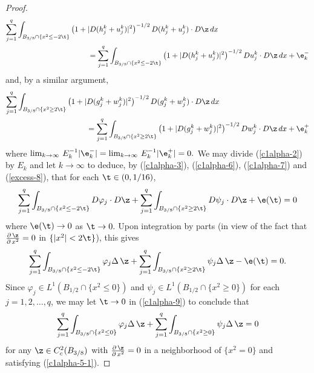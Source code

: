 \documentclass[a4paper,11pt]{amsart}
\begin{document}
\begin{proof}
\begin{eqnarray}\label{c1alpha-6}
\sum_{j=1}^{q}\int_{B_{3/8} \cap \{x^{2} \leq -2\t\}}\left(1 + |D(h_{j}^{k} + u_{j}^{k})|^{2}\right)^{-1/2} D(h_{j}^{k} + u_{j}^{k}) \cdot D\z \,dx &&\nonumber\\
&&\hspace{-2.5in}=\sum_{j=1}^{q}\int_{B_{3/8} \cap \{x^{2} \leq -2\t\}} \left(1 + |D(h_{j}^{k} + u_{j}^{k})|^{2}\right)^{-1/2}Du_{j}^{k}\cdot D\z \,dx + \e^{-}_{k}
\end{eqnarray}
and,  by a similar argument, 
\begin{eqnarray}\label{c1alpha-7}
\sum_{j=1}^{q}\int_{B_{3/8} \cap \{x^{2} \geq 2\t\}}\left(1 + |D(g_{j}^{k} + w_{j}^{k})|^{2}\right)^{-1/2}D(g_{j}^{k} + w_{j}^{k}) \cdot D\z \,dx &&\nonumber\\
&&\hspace{-2.5in}=\sum_{j=1}^{q}\int_{B_{3/8} \cap \{x^{2} \geq 2\t\}} \left(1 + |D(g_{j}^{k} + w_{j}^{k})|^{2}\right)^{-1/2}Dw_{j}^{k}\cdot D\z \,dx + \e^{+}_{k}
\end{eqnarray}
where $\lim_{k\to \infty} \, E_{k}^{-1}|\e_{k}^{-}| =\lim_{k \to \infty} \, E_{k}^{-1}|\e_{k}^{+}|= 0.$ We may divide (\ref{c1alpha-2}) by $E_{k}$ and let $k \to \infty$ to deduce, by 
(\ref{c1alpha-3}), (\ref{c1alpha-6}), (\ref{c1alpha-7}) and (\ref{excess-8}),  that for each $\t \in (0, 1/16)$, 
\begin{equation}\label{c1alpha-8}
\sum_{j=1}^{q}\int_{B_{3/8} \cap \{x^{2} \leq -2\t\}} D\varphi_{j} \cdot D\z + 
\sum_{j=1}^{q} \int_{B_{3/8} \cap \{x^{2} \geq 2\t\}} D\psi_{j} \cdot D\z + \e(\t) = 0
\end{equation}
where $\e(\t) \to 0$ as $\t \to 0.$ Upon integration by parts (in view of the fact that $\frac{\partial \, \z}{\partial \, x^{2}} = 0$ in $\{|x^{2}| < 2\t\}$), this gives
\begin{equation}\label{c1alpha-9}
\sum_{j=1}^{q}\int_{B_{3/8} \cap \{x^{2} \leq -2\t\}} \varphi_{j} \Delta \,\z + 
\sum_{j=1}^{q} \int_{B_{3/8} \cap \{x^{2} \geq 2\t\}} \psi_{j}  \Delta \, \z - \e(\t) = 0.
\end{equation}
Since $\varphi_{j} \in L^{1}(B_{1/2} \cap \{x^{2} \leq 0\})$ and $\psi_{j} \in L^{1}(B_{1/2} \cap \{x^{2} \geq 0\})$ for 
each $j=1, 2, \ldots, q$, we may let $\t \to 0$ in (\ref{c1alpha-9}) to conclude that 
\begin{equation}\label{c1alpha-10}
\sum_{j=1}^{q}\int_{B_{3/8} \cap \{x^{2} \leq 0\}} \varphi_{j} \Delta \,\z + 
\sum_{j=1}^{q} \int_{B_{3/8} \cap \{x^{2} \geq 0\}} \psi_{j}  \Delta \, \z  = 0
\end{equation}
for any  $\z \in C^{2}_{c}(B_{3/8})$ with 
$\frac{\partial \, \z}{\partial \, x^{2}} = 0$ in a neighborhood of $\{x^{2} = 0\}$ and satisfying 
(\ref{c1alpha-5-1}).  



\end{proof}
\end{document}
